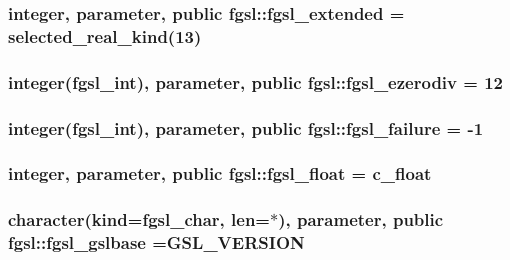 \subsubsection[{fgsl\+\_\+extended}]{\setlength{\rightskip}{0pt plus 5cm}integer, parameter, public fgsl\+::fgsl\+\_\+extended = selected\+\_\+real\+\_\+kind(13)}\label{namespacefgsl_a9f38abe97062020e8a507aaa5bc683ab}
\hypertarget{namespacefgsl_a13b65889d69077a99a6f13522883061f}{}
\subsubsection[{fgsl\+\_\+ezerodiv}]{\setlength{\rightskip}{0pt plus 5cm}integer({\bf fgsl\+\_\+int}), parameter, public fgsl\+::fgsl\+\_\+ezerodiv = 12}\label{namespacefgsl_a13b65889d69077a99a6f13522883061f}
\hypertarget{namespacefgsl_a4cb2b20fedfc04419dd412d3bdc635e0}{}
\subsubsection[{fgsl\+\_\+failure}]{\setlength{\rightskip}{0pt plus 5cm}integer({\bf fgsl\+\_\+int}), parameter, public fgsl\+::fgsl\+\_\+failure = -\/1}\label{namespacefgsl_a4cb2b20fedfc04419dd412d3bdc635e0}
\hypertarget{namespacefgsl_a5721fab55a48ca577c4557fdb1861eb6}{}
\subsubsection[{fgsl\+\_\+float}]{\setlength{\rightskip}{0pt plus 5cm}integer, parameter, public fgsl\+::fgsl\+\_\+float = c\+\_\+float}\label{namespacefgsl_a5721fab55a48ca577c4557fdb1861eb6}
\hypertarget{namespacefgsl_ad8d3e2a5a480d0a6e9569ef516c5dff4}{}
\subsubsection[{fgsl\+\_\+gslbase}]{\setlength{\rightskip}{0pt plus 5cm}character(kind={\bf fgsl\+\_\+char}, len=$\ast$), parameter, public fgsl\+::fgsl\+\_\+gslbase =G\+S\+L\+\_\+\+V\+E\+R\+S\+I\+O\+N}\label{namespacefgsl_ad8d3e2a5a480d0a6e9569ef516c5dff4}
\hypertarget{namespacefgsl_a222deda1d7a0c0e845ce4a683318efeb}{}
